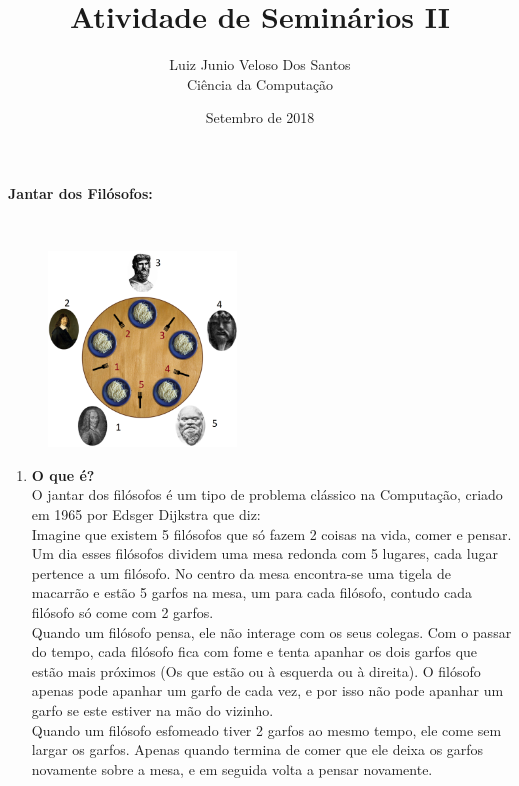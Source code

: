 \documentclass[a4paper, article]{article}
\begin{document}
 
    \title{\vspace{-3cm}Atividade de Seminários II}
    \author{Luiz Junio Veloso Dos Santos\\ Ciência da Computação}
    \date{Setembro de 2018}
    \maketitle

    \begin{enumerate}
        {\large \item \textbf{Jantar dos Filósofos:}}\\
            \begin{figure}[h]
                \centering
                \includegraphics[width=5cm]{Imagens/jdf.png}
            \end{figure}
            \begin{enumerate}
                \item \textbf{O que é?}\\
                O jantar dos filósofos é um tipo de problema clássico na Computação, criado
                em 1965 por Edsger Dijkstra que diz:\\
                
                Imagine que existem 5 filósofos que só fazem 2 coisas na vida, comer e pensar.
                Um dia esses filósofos dividem uma mesa redonda com 5 lugares, cada lugar pertence
                a um filósofo. No centro da mesa encontra-se uma tigela de macarrão e 
                estão 5 garfos na mesa, um para cada filósofo, contudo cada filósofo só come com 2
                garfos.\\
                Quando um filósofo pensa, ele não interage com os seus colegas. Com o passar do tempo,
                cada filósofo fica com fome e tenta apanhar os dois garfos que estão mais próximos
                (Os que estão ou à esquerda ou à direita). O filósofo apenas pode apanhar um garfo
                de cada vez, e por isso não pode apanhar um garfo se este estiver na mão do vizinho.\\
                Quando um filósofo esfomeado tiver 2 garfos ao mesmo tempo, ele come sem largar os garfos.
                Apenas quando termina de comer que ele deixa os garfos novamente sobre a mesa, e em seguida
                volta a pensar novamente.\\ 


\end{enumerate}
\end{enumerate}
\end{document}
